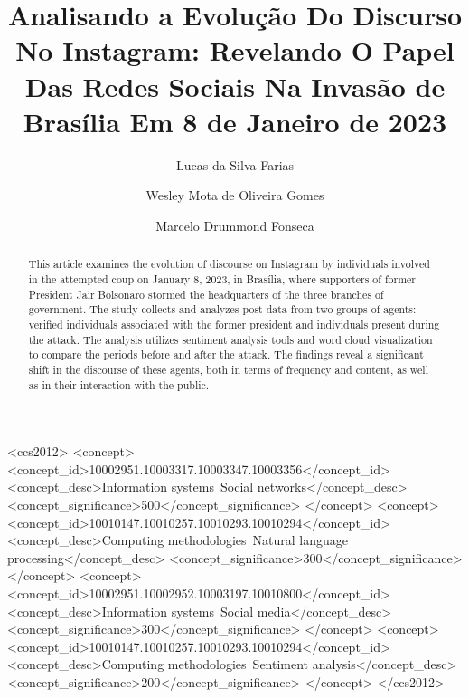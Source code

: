 \documentclass[manuscript,screen,review]{acmart}
\begin{document}
\title{Analisando a Evolução Do Discurso No Instagram: Revelando O Papel Das Redes Sociais Na Invasão de Brasília Em 8 de Janeiro de 2023}

\author{Lucas da Silva Farias}

\author{Wesley Mota de Oliveira Gomes}

\author{Marcelo Drummond Fonseca}

\renewcommand{\shortauthors}{Farias et al.}

\begin{abstract}
This article examines the evolution of discourse on Instagram by individuals involved in the attempted coup on January 8, 2023, in Brasília, where supporters of former President Jair Bolsonaro stormed the headquarters of the three branches of government. The study collects and analyzes post data from two groups of agents: verified individuals associated with the former president and individuals present during the attack. The analysis utilizes sentiment analysis tools and word cloud visualization to compare the periods before and after the attack. The findings reveal a significant shift in the discourse of these agents, both in terms of frequency and content, as well as in their interaction with the public.
\end{abstract}

\begin{CCSXML}
<ccs2012>
 <concept>
  <concept_id>10002951.10003317.10003347.10003356</concept_id>
  <concept_desc>Information systems~Social networks</concept_desc>
  <concept_significance>500</concept_significance>
 </concept>
 <concept>
  <concept_id>10010147.10010257.10010293.10010294</concept_id>
  <concept_desc>Computing methodologies~Natural language processing</concept_desc>
  <concept_significance>300</concept_significance>
 </concept>
 <concept>
  <concept_id>10002951.10002952.10003197.10010800</concept_id>
  <concept_desc>Information systems~Social media</concept_desc>
  <concept_significance>300</concept_significance>
 </concept>
 <concept>
  <concept_id>10010147.10010257.10010293.10010294</concept_id>
  <concept_desc>Computing methodologies~Sentiment analysis</concept_desc>
  <concept_significance>200</concept_significance>
 </concept>
</ccs2012>
\end{CCSXML}
\end{document}

